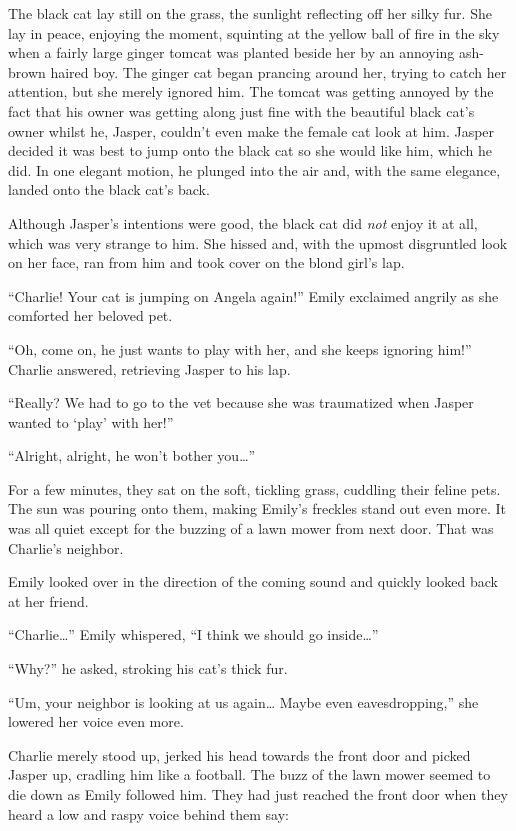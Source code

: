 The black cat lay still on the grass, the sunlight reflecting off her silky fur. She lay in peace, enjoying the moment, squinting at the yellow ball of fire in the sky when a fairly large ginger tomcat was planted beside her by an annoying ash-brown haired boy. The ginger cat began prancing around her, trying to catch her attention, but she merely ignored him. The tomcat was getting annoyed by the fact that his owner was getting along just fine with the beautiful black cat’s owner whilst he, Jasper, couldn’t even make the female cat look at him. Jasper decided it was best to jump onto the black cat so she would like him, which he did. In one elegant motion, he plunged into the air and, with the same elegance, landed onto the black cat’s back.

Although Jasper’s intentions were good, the black cat did \textit{not} enjoy it at all, which was very strange to him. She hissed and, with the upmost disgruntled look on her face, ran from him and took cover on the blond girl’s lap.

“Charlie! Your cat is jumping on Angela again!” Emily exclaimed angrily as she comforted her beloved pet.

“Oh, come on, he just wants to play with her, and she keeps ignoring him!” Charlie answered, retrieving Jasper to his lap.

“Really? We had to go to the vet because she was traumatized when Jasper wanted to ‘play’ with her!”

“Alright, alright, he won’t bother you…”

For a few minutes, they sat on the soft, tickling grass, cuddling their feline pets. The sun was pouring onto them, making Emily’s freckles stand out even more. It was all quiet except for the buzzing of a lawn mower from next door. That was Charlie’s neighbor.

Emily looked over in the direction of the coming sound and quickly looked back at her friend.

“Charlie…” Emily whispered, “I think we should go inside…”

“Why?” he asked, stroking his cat’s thick fur.

“Um, your neighbor is looking at us again… Maybe even eavesdropping,” she lowered her voice even more.

Charlie merely stood up, jerked his head towards the front door and picked Jasper up, cradling him like a football. The buzz of the lawn mower seemed to die down as Emily followed him. They had just reached the front door when they heard a low and raspy voice behind them say:

